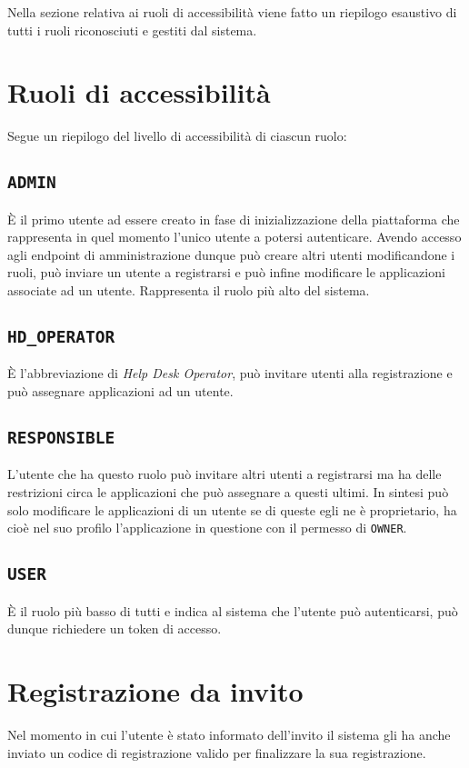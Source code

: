 \documentclass[a4paper,12pt]{article}
\begin{document}
Nella sezione relativa ai ruoli di accessibilità viene fatto un riepilogo esaustivo di tutti i ruoli riconosciuti e gestiti dal sistema.

\section{Ruoli di accessibilità}
\label{roles}

Segue un riepilogo del livello di accessibilità di ciascun ruolo:
\subsection{\texttt{ADMIN}}
È il primo utente ad essere creato in fase di inizializzazione della piattaforma che rappresenta in quel momento l'unico utente a potersi autenticare. Avendo accesso agli endpoint di amministrazione dunque può creare altri utenti modificandone i ruoli, può inviare un utente a registrarsi e può infine modificare le applicazioni associate ad un utente. Rappresenta il ruolo più alto del sistema.

\subsection{\texttt{HD\_OPERATOR}}
È l'abbreviazione di \textit{Help Desk Operator}, può invitare utenti alla registrazione e può assegnare applicazioni ad un utente.

\subsection{\texttt{RESPONSIBLE}}
L'utente che ha questo ruolo può invitare altri utenti a registrarsi ma ha delle restrizioni circa le applicazioni che può assegnare a questi ultimi. In sintesi può solo modificare le applicazioni di un utente se di queste egli ne è proprietario, ha cioè nel suo profilo l'applicazione in questione con il permesso di \texttt{OWNER}.

\subsection{\texttt{USER}}
È il ruolo più basso di tutti e indica al sistema che l'utente può autenticarsi, può dunque richiedere un token di accesso.

\section{Registrazione da invito}
Nel momento in cui l’utente è stato informato dell’invito il sistema gli ha anche inviato un codice di registrazione valido per finalizzare la sua registrazione.\\
\end{document}
